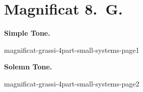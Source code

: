 {
\cleartoleftpage{}
\thispagestyle{empty}
\newcommand{\printsimpletone}{
\needspace{3\baselineskip}
\begin{center}\textbf{Simple Tone.}\end{center}
\vspace{0ex plus 0ex minus 2ex}
}
\newcommand{\printsolemntone}{
\needspace{3\baselineskip}
\begin{center}\textbf{Solemn Tone.}\end{center}
\vspace{0ex plus 0ex minus 1ex}
}

\label{magnificat-grassi}
\vspace*{-\headheight}
\vspace*{-0.5\baselineskip}
\section{Magnificat 8.~G.}

\vspace{-\baselineskip}
\def\betweenLilyPondSystem#1{
  \ifnum#1>1
    \vfil\noindent
  \else
    \linebreak
  \fi
}
\newcommand{\includelilypond}[1]{
  \noindent
  {#1}
}
\def\magsolemn{F}
\def\maggrassi{T}
\def\annot{\magtone.~\magend}
\def\greinitialformat#1{%
{\fontsize{50}{50}\selectfont #1}%
}
\printsimpletone{}
\begin{boldnummagnificat}{\magtex}
\magverses
\end{boldnummagnificat}


\vfill
\includelilypond{magnificat-grassi-4part-small-systems-page1}
\pagebreak


\def\magsolemn{T}
\let\magant=\undefined
\let\magantlinetwo=\undefined
\let\magtex=\undefined
\let\magverses=\undefined
{}
\def\annot{\magtone.~\magend}
\printsolemntone{}
\begin{boldnummagnificat}{\magtex}
\magverses
\end{boldnummagnificat}


\vfill
\includelilypond{magnificat-grassi-4part-small-systems-page2}
}